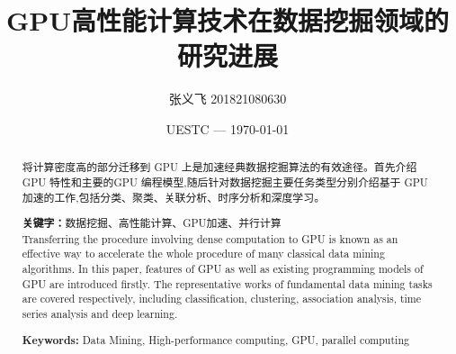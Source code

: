 \documentclass{article}
\title{GPU高性能计算技术在数据挖掘领域的研究进展}
\author{张义飞 201821080630}
\date{UESTC --- \today}
\begin{document}
    
    \maketitle

    \begin{abstract}
        将计算密度高的部分迁移到 GPU 上是加速经典数据挖掘算法的有效途径。首先介绍 GPU 特性和主要的GPU 编程模型,随后针对数据挖掘主要任务类型分别介绍基于 GPU 加速的工作,包括分类、聚类、关联分析、时序分析和深度学习。

        \textbf{关键字：}数据挖掘、高性能计算、GPU加速、并行计算\\

        Transferring the procedure involving dense computation to GPU is known as an effective way to accelerate the whole procedure of many classical data mining algorithms. In this paper, features of GPU as well as existing programming models of GPU are introduced firstly. The representative works of fundamental data mining tasks are covered respectively, including classification, clustering, association analysis, time series analysis and deep learning.

        \textbf{Keywords: }Data Mining, High-performance computing, GPU, parallel computing
    \end{abstract}
\end{document}
